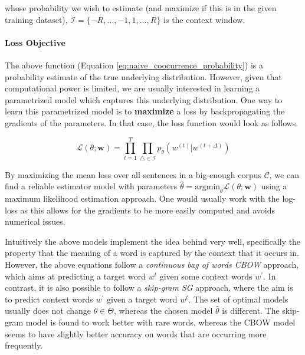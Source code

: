 \documentclass[a4paper,12pt,oneside,openright]{report}
\begin{document}
whose probability we wish to estimate (and maximize if this is in the given training dataset), $\mathcal{I}=\{-R, \ldots,-1,1, \ldots, R\}$ is the context window. 

\paragraph{Loss Objective} The above function (Equation \eqref{eq:naive_coocurrence_probability}) is a probability estimate of the true underlying distribution.
However, given that computational power is limited, we are usually interested in learning a parametrized model which captures this underlying distribution.
One way to learn this parametrized model is to \textbf{maximize} a loss by backpropagating the gradients of the parameters.
In that case, the loss function would look as follows.


\begin{equation}
\mathcal{L}(\theta ; \mathbf{w})= \prod_{t=1}^{T} \prod_{\triangle \in \mathcal{I}} p_{\theta}\left(w^{(t)} | w^{(t +\Delta)}\right)
\end{equation}{\label{eq:basic_equation_log_maximization}}

By maximizing the mean loss over all sentences in a big-enough corpus $\mathcal{C}$, we can find a reliable estimator model with parameters $\hat{\theta} = \text{argmin}_\theta \mathcal{L}(\theta ; \mathbf{w})$ using a maximum likelihood estimation approach.
One would usually work with the log-loss as this allows for the gradients to be more easily computed and avoids numerical issues.

Intuitively the above models implement the idea  behind \cite{harris54} very well, specifically the property that the meaning of a word is captured by the context that it occurs in.
However, the above equations follow a \textit{continuous bag of words CBOW} approach, which aims at predicting a target word $w^t$ given some context words $w^{\prime}$.
In contrast, it is also possible to follow a \textit{skip-gram SG} approach, where the aim is to predict context words $w^{\prime}$ given a target word $w^t$.
The set of optimal models usually does not change $\theta \in \Theta$, whereas the chosen model $\hat{\theta}$ is different.
The skip-gram model is found to work better with rare words, whereas the CBOW model seems to have slightly better accuracy on words that are occurring more frequently.
\end{document}
